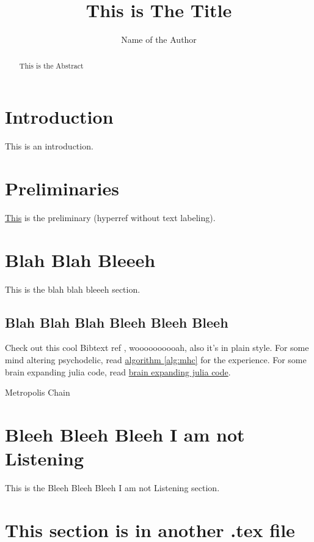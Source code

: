 \documentclass[]{article}
\title{This is The Title}
\author{Name of the Author}
\theoremstyle{definition}
\numberwithin{equation}{subsection}
\begin{document}
\maketitle

\begin{abstract}
    This is the Abstract
\end{abstract}


\section{Introduction}
    This is an introduction. 

\section{Preliminaries}\label{sec:preliminaries}
    \hyperref[sec:preliminaries]{This} is the preliminary (hyperref without text labeling). 
    
\section{Blah Blah Bleeeh}
    This is the blah blah bleeeh section. 
    \subsection{Blah Blah Blah Bleeh Bleeh Bleeh}
    Check out this cool Bibtext ref \cite[this]{texbook}, woooooooooah, also it's in plain style. For some mind altering psychodelic, read \hyperref[alg:mhc]{algorithm \ref*{alg:mhc}} for the experience. For some brain expanding julia code, read \hyperref[code:brain_expand]{brain expanding julia code}. 
    \begin{algorithm}
        \begin{algorithmic}[H]
        \end{algorithmic}
        \caption{Metropolis Chain}
        \label{alg:mhc}
    \end{algorithm}
    \label{code:brain_expand}
    
    
        

\appendix
\section{Bleeh Bleeh Bleeh I am not Listening}
    This is the Bleeh Bleeh Bleeh I am not Listening section. 

\section{This section is in another .tex file} 
    





\end{document}
